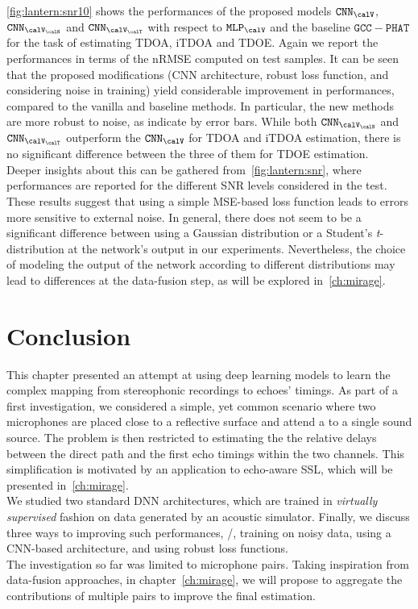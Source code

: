 \noindent \cref{fig:lantern:snr10} shows the performances of the proposed models $\mathtt{CNN}_{\calV}$, $\mathtt{CNN}_{\calV_\calN}$ and $\mathtt{CNN}_{\calV_\calT}$
with respect to $\mathtt{MLP}_{\calV}$ and the baseline $\mathtt{GCC-PHAT}$ for the task of estimating \ac{TDOA}, \ac{iTDOA} and \ac{TDOE}.
Again we report the performances in terms of the \ac{nRMSE} computed on test samples.
It can be seen that the proposed modifications (\ac{CNN} architecture, robust loss function, and considering noise in training) yield considerable improvement in performances, compared to the vanilla and baseline methods.
In particular, the new methods are more robust to noise, as indicate by error bars.
While both $\mathtt{CNN}_{\calV_\calN}$ and $\mathtt{CNN}_{\calV_\calT}$ outperform the $\mathtt{CNN}_{\calV}$ for \ac{TDOA} and \ac{iTDOA} estimation, there is no significant difference between the three of them for \ac{TDOE} estimation.
\\Deeper insights about this can be gathered from~\cref{fig:lantern:snr}, where performances are reported for the different \ac{SNR} levels considered in the test.
These results suggest that using a simple \ac{MSE}-based loss function leads to errors more sensitive to external noise.
In general, there does not seem to be a significant difference between using a Gaussian distribution or a Student's \textit{t}-distribution at the network's output in our experiments.
Nevertheless, the choice of modeling the output of the network according to different distributions may lead to differences at the data-fusion step, as will be explored in~\cref{ch:mirage}.

\section{Conclusion}\label{sec:lantern:conclusion}
This chapter presented an attempt at using deep learning models to learn the complex mapping from stereophonic recordings to echoes' timings.
As part of a first investigation, we considered a simple, yet common scenario where two microphones are placed close to a reflective surface and attend a to a single sound source.
The problem is then restricted to estimating the the relative delays between the direct path and the first echo timings within the two channels.
This simplification is motivated by an application to echo-aware \ac{SSL}, which will be presented in~\cref{ch:mirage}.
\\We studied two standard \ac{DNN} architectures, which are trained in \textit{virtually supervised} fashion on data generated by an acoustic simulator.
Finally, we discuss three ways to improving such performances, \ie/, training on noisy data, using a \ac{CNN}-based architecture, and using robust loss functions.
\\The investigation so far was limited to microphone pairs.
Taking inspiration from data-fusion approaches, in chapter~\cref{ch:mirage}, we will propose to aggregate the contributions of multiple pairs to improve the final estimation.

